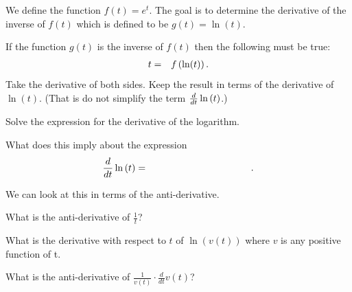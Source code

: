\begin{problem}

\item We define the function $f(t)=e^t$. The goal is to determine the
  derivative of the inverse of $f(t)$ which is defined to be $g(t)=\ln(t)$.
  \begin{subproblem}
  \item If the function $g(t)$ is the inverse of $f(t)$ then the following must be true:
    \begin{eqnarray*}
      t & = & f\left(\ln (t) \right).
    \end{eqnarray*}
    Take the derivative of both sides.  Keep the result in terms of the derivative of $\ln(t)$.  (That is do not simplify the term
    $\frac{d}{dt} \ln\left( t \right)$.)
    \vfill
  \item Solve the expression for the derivative of the logarithm.
    \vfill
  \item What does this imply about the expression
  \begin{eqnarray*}
    \frac{d}{dt} \ln\lp t \rp & = & \hspace{10em}.
  \end{eqnarray*}
  \end{subproblem}

\clearpage

\item We can look at this in terms of the anti-derivative.
\begin{subproblem}
    \item What is the anti-derivative of $\frac{1}{t}$?
      \vfill
    \item What is the derivative with respect to $t$ of $\ln(v(t))$ where $v$ is any positive function of t.
      \vfill
    \item What is the anti-derivative of $\frac{1}{v(t)}\cdot \frac{d}{dt} v(t)$?
      \vfill
\end{subproblem}

\clearpage


\end{problem}
